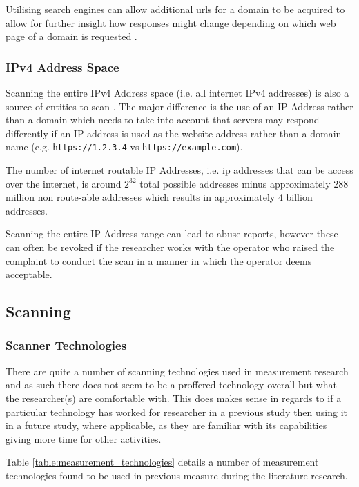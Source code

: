\documentclass{mscreport}
\begin{document}
Utilising search engines can allow additional urls for a domain to be acquired to allow for further insight how responses might change depending on which web page of a domain is requested \cite{Chen2016-dl}.

\subsubsection{IPv4 Address Space}

Scanning the entire IPv4 Address space (i.e. all internet  IPv4 addresses) is also a source of entities to scan \cite{Kotzias2018-wd}. The major difference is the use of an IP Address rather than a domain which needs to take into account that servers may respond differently if an IP address is used as the website address rather than a domain name (e.g. \texttt{https://1.2.3.4} vs \texttt{https://example.com}).

\vspace{0.3cm} \noindent
The number of internet routable IP Addresses, i.e. ip addresses that can be access over the internet, is around \(2^{32}\) total possible addresses minus approximately 288 million non route-able addresses which results in approximately 4 billion addresses.

\vspace{0.3cm} \noindent
Scanning the entire IP Address range can lead to abuse reports, however these can often be revoked if the researcher works with the operator who raised the complaint to conduct the scan in a manner in which the operator deems acceptable.

\subsection{Scanning}


\subsubsection{Scanner Technologies}

\noindent
There are quite a number of scanning technologies used in measurement research and as such there does not seem to be a proffered technology overall but what the researcher(s) are comfortable with. This does makes sense in regards to if a particular technology has worked for researcher in a previous study then using it in a future study, where applicable, as they are familiar with its capabilities giving more time for other activities.

\vspace{0.3cm} \noindent
Table \ref{table:measurement_technologies} details a number of measurement technologies found to be used in previous measure during the literature research.
\end{document}
